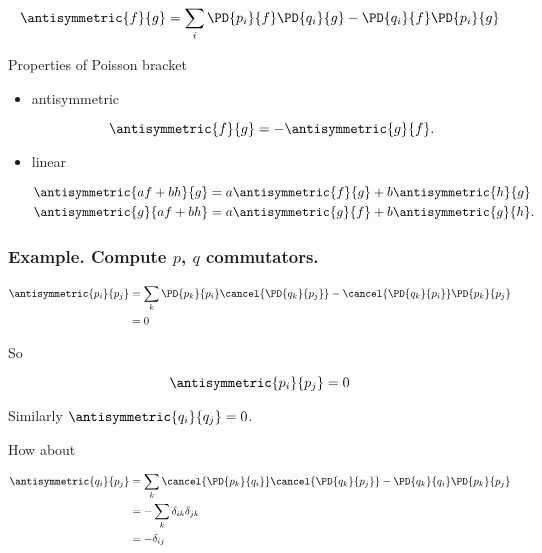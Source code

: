 \begin{equation}\label{eqn:phaseSpaceAndTrajectories:110}
\antisymmetric{f}{g} =
\sum_i
\PD{p_i}{f}
\PD{q_i}{g}
-
\PD{q_i}{f}
\PD{p_i}{g}
\end{equation}

Properties of Poisson bracket

\begin{itemize}
\item antisymmetric

\begin{equation}\label{eqn:phaseSpaceAndTrajectories:130}
\antisymmetric{f}{g} = -\antisymmetric{g}{f}.
\end{equation}

\item linear

\begin{align}\label{eqn:phaseSpaceAndTrajectories:150}
\antisymmetric{a f + b h}{g} &= a \antisymmetric{f}{g} + b\antisymmetric{h}{g} \\
\antisymmetric{g}{a f + b h} &= a \antisymmetric{g}{f} + b\antisymmetric{g}{h}.
\end{align}
\end{itemize}

\subsubsection{Example.  Compute $p$, $q$ commutators.}

\begin{align*}
\antisymmetric{p_i}{p_j} 
&= 
\sum_k
\PD{p_k}{p_i}
\cancel{
\PD{q_k}{p_j}
}
-
\cancel{
\PD{q_k}{p_i}
}
\PD{p_k}{p_j} \\
&= 0
\end{align*}

So 

\begin{equation}\label{eqn:phaseSpaceAndTrajectories:170}
\antisymmetric{p_i}{p_j} = 0
\end{equation}

Similarly $\antisymmetric{q_i}{q_j} = 0$.

How about

\begin{align*}
\antisymmetric{q_i}{p_j} 
&= 
\sum_k
\cancel{
\PD{p_k}{q_i}
}
\cancel{
\PD{q_k}{p_j}
}
-
\PD{q_k}{q_i}
\PD{p_k}{p_j} \\
&= 
-
\sum_k
\delta_{ik}
\delta_{jk} \\
&=
-\delta_{ij}
\end{align*}

